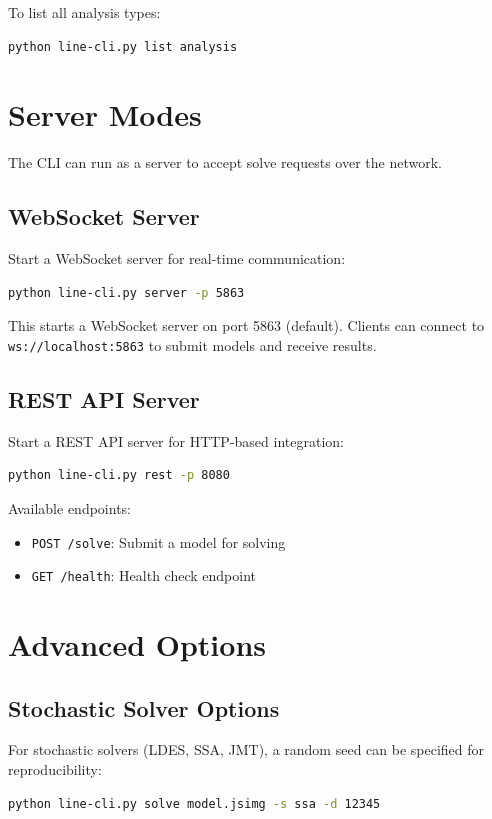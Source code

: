 To list all analysis types:
\begin{lstlisting}[language=bash, basicstyle=\ttfamily\footnotesize]
python line-cli.py list analysis
\end{lstlisting}

\section{Server Modes}
\label{cli-server-modes}

The CLI can run as a server to accept solve requests over the network.

\subsection{WebSocket Server}
Start a WebSocket server for real-time communication:
\begin{lstlisting}[language=bash, basicstyle=\ttfamily\footnotesize]
python line-cli.py server -p 5863
\end{lstlisting}
This starts a WebSocket server on port 5863 (default). Clients can connect to \texttt{ws://localhost:5863} to submit models and receive results.

\subsection{REST API Server}
Start a REST API server for HTTP-based integration:
\begin{lstlisting}[language=bash, basicstyle=\ttfamily\footnotesize]
python line-cli.py rest -p 8080
\end{lstlisting}
Available endpoints:
\begin{itemize}
\item \texttt{POST /solve}: Submit a model for solving
\item \texttt{GET /health}: Health check endpoint
\end{itemize}

\section{Advanced Options}
\label{cli-advanced-options}

\subsection{Stochastic Solver Options}
For stochastic solvers (LDES, SSA, JMT), a random seed can be specified for reproducibility:
\begin{lstlisting}[language=bash, basicstyle=\ttfamily\footnotesize]
python line-cli.py solve model.jsimg -s ssa -d 12345
\end{lstlisting}

